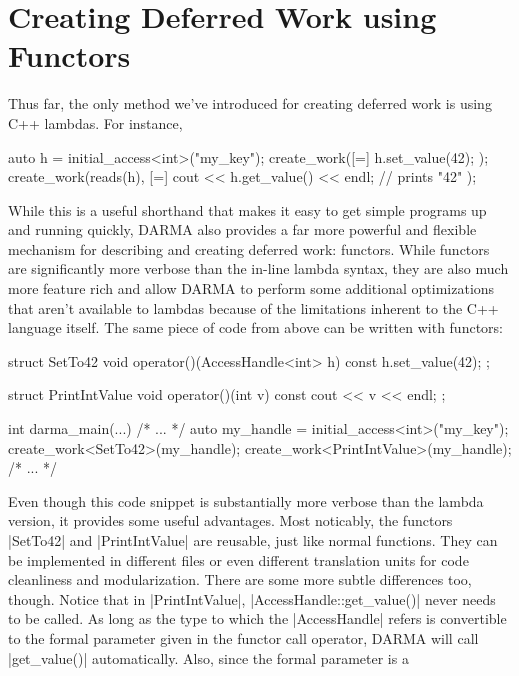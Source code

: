 
\section{Creating Deferred Work using Functors}
\label{sec:functor}

\lstMakeShortInline[style=CppCodeInlineStyle]{\|}

Thus far, the only method we've introduced for creating deferred work is using
C++ lambdas.  For instance,
\begin{CppCodeNumb}
auto h = initial_access<int>("my_key");
create_work([=]{ h.set_value(42); });
create_work(reads(h), [=]{ 
  cout << h.get_value() << endl; // prints "42"
});
\end{CppCodeNumb}
While this is a useful shorthand that makes it easy to get simple programs up
and running quickly, DARMA also provides a far more powerful and flexible
mechanism for describing and creating deferred work:  functors.  While functors
are significantly more verbose than the in-line lambda syntax, they are also
much more feature rich and allow DARMA to perform some additional optimizations
that aren't available to lambdas because of the limitations inherent to the C++
language itself.  The same piece of code from above can be written with
functors:
\begin{CppCodeNumb}
struct SetTo42 {
  void operator()(AccessHandle<int> h) const {
    h.set_value(42);
  }
};

struct PrintIntValue {
  void operator()(int v) const {
    cout << v << endl;
  }
};

int darma_main(...) {
  /* ... */
  auto my_handle = initial_access<int>("my_key");
  create_work<SetTo42>(my_handle);
  create_work<PrintIntValue>(my_handle);
  /* ... */
}
\end{CppCodeNumb}
Even though this code snippet is substantially more verbose than the lambda
version, it provides some useful advantages.  Most noticably, the functors
|SetTo42| and |PrintIntValue| are reusable, just like normal functions.  They
can be implemented in different files or even different translation units for
code cleanliness and modularization.  There are some more subtle differences
too, though.  Notice that in |PrintIntValue|, |AccessHandle::get_value()| never
needs to be called.  As long as the type to which the |AccessHandle| refers is
convertible to the formal parameter given in the functor call operator, DARMA
will call |get_value()| automatically.  Also, since the formal parameter is a
